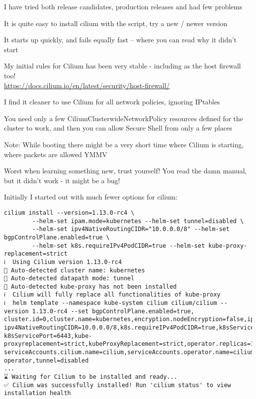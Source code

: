 \documentclass[Screen16to9,17pt]{foils}
\begin{document}

\begin{list2}
\item I have tried both release candidates, production releases and had few problems
\item It is quite easy to install cilium with the script, try a new / newer version
\item It starts up quickly, and fails equally fast -- where you can read why it didn't start
\item My initial rules for Cilium has been very stable - including as the host firewall too!\\
\url{https://docs.cilium.io/en/latest/security/host-firewall/}
\item I find it cleaner to use Cilium for all network policies, ignoring IPtables
\item You need only a few CiliumClusterwideNetworkPolicy resources defined for the cluster to work, and then you can allow Secure Shell from only a few places
\item Note: While booting there might be a very short time where Cilium is starting, where packets are allowed YMMV
\end{list2}

Worst when learning something new, trust yourself! You read the damn manual, but it didn't work - it might be a bug!


Initially I started out with much fewer options for cilium:
\begin{verbatim}
cilium install --version=1.13.0-rc4 \
		--helm-set ipam.mode=kubernetes --helm-set tunnel=disabled \
		--helm-set ipv4NativeRoutingCIDR="10.0.0.0/8" --helm-set bgpControlPlane.enabled=true \
		--helm-set k8s.requireIPv4PodCIDR=true --helm-set kube-proxy-replacement=strict
ℹ️  Using Cilium version 1.13.0-rc4
🔮 Auto-detected cluster name: kubernetes
🔮 Auto-detected datapath mode: tunnel
🔮 Auto-detected kube-proxy has not been installed
ℹ️  Cilium will fully replace all functionalities of kube-proxy
ℹ️  helm template --namespace kube-system cilium cilium/cilium --version 1.13.0-rc4 --set bgpControlPlane.enabled=true,
cluster.id=0,cluster.name=kubernetes,encryption.nodeEncryption=false,ipam.mode=kubernetes,
ipv4NativeRoutingCIDR=10.0.0.0/8,k8s.requireIPv4PodCIDR=true,k8sServiceHost=10.137.0.26,
k8sServicePort=6443,kube-proxyreplacement=strict,kubeProxyReplacement=strict,operator.replicas=1,
serviceAccounts.cilium.name=cilium,serviceAccounts.operator.name=cilium-operator,tunnel=disabled
...
⌛ Waiting for Cilium to be installed and ready...
✅ Cilium was successfully installed! Run 'cilium status' to view installation health
\end{verbatim}
\end{document}
